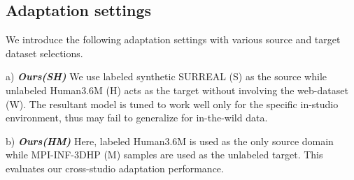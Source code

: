 \documentclass{article}
\begin{document}
\vspace{-2mm}
\subsection{Adaptation settings}
\vspace{-2.5mm}
We introduce the following adaptation settings with various source and target dataset selections.


\noindent
a) \textit{\textbf{Ours(SH)}} We use labeled synthetic SURREAL (S) as the source while unlabeled Human3.6M (H) acts as the target without involving the web-dataset (W). The resultant model is tuned to work well only for the specific in-studio environment, thus may fail to generalize for in-the-wild data.





\noindent
b) \textit{\textbf{Ours(HM)}} Here, labeled Human3.6M is used as the only source domain while MPI-INF-3DHP (M) samples are used as the unlabeled target. This evaluates our cross-studio adaptation performance.
\end{document}
